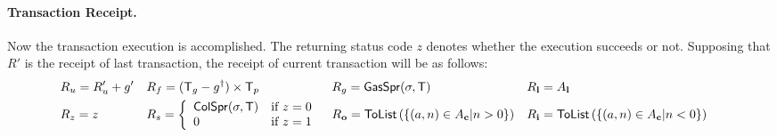 

\paragraph{Transaction Receipt.} 

Now the transaction execution is accomplished.
The returning status code $z$ denotes whether the execution succeeds or not. 
Supposing that $R'$ is the receipt of last transaction, 
the receipt of current transaction will be as follows:
\begin{align}
	& R_u=R'_u+g' && R_f = (\textsf{T}_g-g^{\dagger})\times \textsf{T}_p && R_g = \mathsf{GasSpr}(\mathbf{\sigma},\textsf{T}) && R_{\bf l}=A_{\bf l} && \\ 
	& R_z=z && R_s = \left\{\begin{array}{ll}
		\mathsf{ColSpr}(\mathbf{\sigma},\textsf{T}) & \text{if }z=0\\
		0 & \text{if }z=1
	\end{array}\right. 
	&& R_{\bf o}=\mathsf{ToList}\left(\left\{(a,n)\in A_{\bf c}| n>0 \right\}\right)
	&& R_{\bf i}=\mathsf{ToList}\left(\left\{(a,n)\in A_{\bf c}| n<0 \right\}\right)
\end{align}



